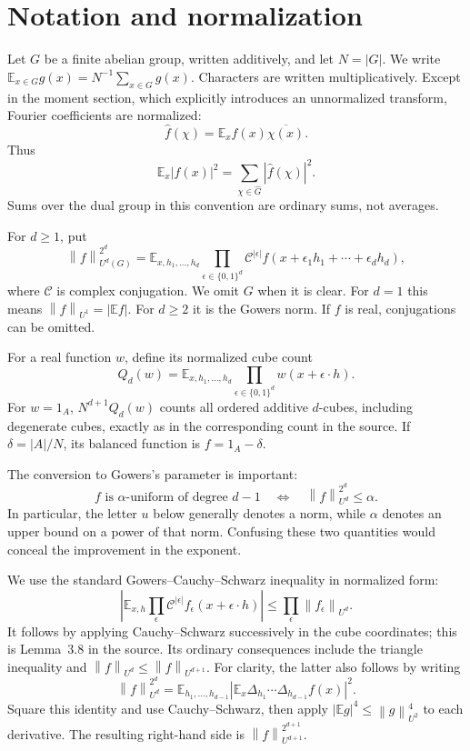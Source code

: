 \documentclass[11pt,letterpaper]{article}
\numberwithin{equation}{section}
\theoremstyle{definition}
\theoremstyle{remark}
\newcommand{\E}{\mathbb E}
\newcommand{\1}{\mathbf 1}
\newcommand{\norm}[1]{\left\|#1\right\|}
\newcommand{\srctag}[1]{\texorpdfstring{\enspace\textup{[#1]}}{ [#1]}}
\newcommand{\srcnote}[2]{\par\noindent{\small\textit{Source #1, delivered #2.}}\par}
\begin{document}
\section[{Notation and normalization\srctag{04}}]{Notation and normalization}\label{gsr:en:04:sec:d2}
\srcnote{04}{Section 2}
\label{gsr:en:04:sec:notation}

Let \(G\) be a finite abelian group, written additively, and let \(N=|G|\).
We write \(\E_{x\in G}g(x)=N^{-1}\sum_{x\in G}g(x)\).
Characters are written multiplicatively.  Except in the moment section,
which explicitly introduces an unnormalized transform, Fourier
coefficients are normalized:
\[
 \widehat f(\chi)=\E_x f(x)\overline{\chi(x)}.
\]
Thus
\[
 \E_x|f(x)|^2=\sum_{\chi\in\widehat G}|\widehat f(\chi)|^2.
\]
Sums over the dual group in this convention are ordinary sums, not
averages.

For \(d\geq1\), put
\[
 \norm f_{U^d(G)}^{2^d}
 =\E_{x,h_1,\ldots,h_d}
   \prod_{\epsilon\in\{0,1\}^d}
    \mathcal C^{|\epsilon|}
    f(x+\epsilon_1h_1+\cdots+\epsilon_dh_d),
\]
where \(\mathcal C\) is complex conjugation.  We omit \(G\) when it is clear.
For \(d=1\) this means \(\norm f_{U^1}=|\E f|\).
For \(d\geq2\) it is the Gowers norm.  If \(f\) is real, conjugations can
be omitted.

For a real function \(w\), define its normalized cube count
\[
 Q_d(w)=
 \E_{x,h_1,\ldots,h_d}\prod_{\epsilon\in\{0,1\}^d}
     w(x+\epsilon\cdot h).
\]
For \(w=1_A\), \(N^{d+1}Q_d(w)\) counts all ordered additive
\(d\)-cubes, including degenerate cubes, exactly as in the corresponding
count in the source.  If \(\delta=|A|/N\), its balanced function is
\(f=1_A-\delta\).

The conversion to Gowers's parameter is important:
\[
 \text{\(f\) is \(\alpha\)-uniform of degree \(d-1\)}
 \quad\Longleftrightarrow\quad
 \norm f_{U^d}^{2^d}\leq\alpha.
\]
In particular, the letter \(u\) below generally denotes a norm, while
\(\alpha\) denotes an upper bound on a power of that norm.  Confusing these
two quantities would conceal the improvement in the exponent.

We use the standard Gowers--Cauchy--Schwarz inequality in normalized form:
\[
 \left|
 \E_{x,h}\prod_{\epsilon}
  \mathcal C^{|\epsilon|}f_\epsilon(x+\epsilon\cdot h)
 \right|
 \leq\prod_\epsilon\norm{f_\epsilon}_{U^d}.
\]
It follows by applying Cauchy--Schwarz successively in the cube
coordinates; this is Lemma~3.8 in the source.
Its ordinary consequences include the triangle inequality and
\(\norm f_{U^d}\leq\norm f_{U^{d+1}}\).
For clarity, the latter also follows by writing
\[
 \norm f_{U^d}^{2^d}
 =\E_{h_1,\ldots,h_{d-1}}
   \left|\E_x\Delta_{h_1}\cdots\Delta_{h_{d-1}}f(x)\right|^2.
\]
Square this identity and use Cauchy--Schwarz, then apply
\(|\E g|^4\leq\norm g_{U^2}^4\) to each derivative.  The resulting
right-hand side is \(\norm f_{U^{d+1}}^{2^{d+1}}\).
\end{document}
